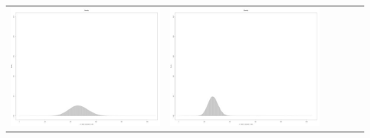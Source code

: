 \begin{table}[htbp]
{\begin{tabular}{l | ccccc}
\begin{minipage}{.15\textwidth}
     			 	\includegraphics[width=\linewidth]{images/mema-dens-graph/I9}
    				 \end{minipage}
    			   &	 \begin{minipage}{.15\textwidth}
     			 	\includegraphics[width=\linewidth]{images/mema-dens-graph/I12}
    				 \end{minipage}
    			   &	 \begin{minipage}{.15\textwidth}

\end{minipage}
\end{tabular}}
\end{table}
